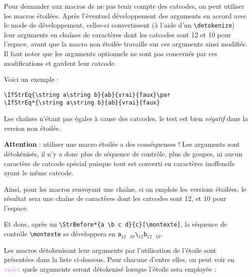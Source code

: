 \documentclass[a4paper,10pt,french]{article}
\newcommand\guill[1]{\og{}#1\fg{}}
\newcommand\styleexercice{\footnotesize}
\newcommand\verbinline{\lstinline[basicstyle=\normalsize\ttfamily]}
\begin{document}
Pour demander aux macros de ne pas tenir compte des catcodes, on peut utiliser les macros étoilées. Après l'éventuel développement des arguments en accord avec le mode de développement, celles-ci convertissent (à l'aide d'un \verb|\detokenize|) leur arguments en chaînes de caractères dont les catcodes sont 12 et 10 pour l'espace, avant que la macro non étoilée travaille sur ces arguments ainsi modifiés. Il faut noter que les arguments optionnels ne sont pas concernés par ces modifications et gardent leur catcode.\smallskip

Voici un exemple :\par\nobreak\smallskip
\begin{minipage}[c]{0.65\linewidth}
\begin{lstlisting}
\IfStrEq{\string a\string b}{ab}{vrai}{faux}\par
\IfStrEq*{\string a\string b}{ab}{vrai}{faux}
\end{lstlisting}%
\end{minipage}\hfill
\begin{minipage}[c]{0.35\linewidth}
	\styleexercice
	\par
\end{minipage}%
\smallskip

Les chaînes n'étant pas égales à cause des catcodes, le test est bien \emph{négatif} dans la version non étoilée.\bigskip

\textbf{Attention} : utiliser une macro étoilée a des conséquenses ! Les arguments sont \guill{détokénisés}, il n'y a donc plus de séquence de contrôle, plus de goupes, ni aucun caractère de catcode spécial puisque tout est converti en caractères \guill{inoffensifs} ayant le même catcode.\medskip

Ainsi, pour les macros renvoyant une chaîne, si on emploie les versions étoilées, le résultat sera une chaîne de caractères dont les catcodes sont 12, et 10 pour l'espace.

Et donc, après un \og\verbinline|\StrBefore*{a \b c d}{c}[\montexte]|\fg{}, la séquence de contrôle \verb|\montexte| se développera en \og{}\verb|a|${}_{12}$\verb*| |${}_{10}$\verb|\|${}_{12}$\verb|b|${}_{12}$\verb*| |${}_{10}$\fg{}.\medskip

Les macros détokenisant leur arguments par l'utilisation de l'étoile sont présentées dans la liste ci-dessous. Pour chacune d'entre elles, on peut voir en \textcolor{violet}{violet} quels arguments seront détokenisé lorsque l'étoile sera employée :
\end{document}
